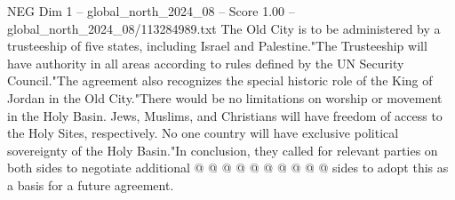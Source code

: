 \begin{textsample}{NEG Dim 1 – global\_north\_2024\_08 – Score 1.00 – global\_north\_2024\_08/113284989.txt}
The Old City is to be administered by a trusteeship of five states, including Israel and Palestine."The Trusteeship will have authority in all areas according to rules defined by the UN Security Council."The agreement also recognizes the special historic role of the King of Jordan in the Old City."There would be no limitations on worship or movement in the Holy Basin.
Jews, Muslims, and Christians will have freedom of access to the Holy Sites, respectively.
No one country will have exclusive political sovereignty of the Holy Basin."In conclusion, they called for relevant parties on both sides to negotiate additional @ @ @ @ @ @ @ @ @ @ sides to adopt this as a basis for a future agreement.

\end{textsample}
